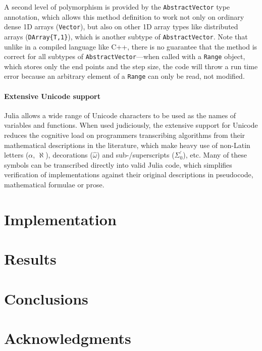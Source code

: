 \documentclass{article}
\begin{document}
A second level of polymorphism is provided by the \lstinline|AbstractVector|
type annotation, which allows this method definition to work not only on
ordinary dense 1D arrays (\lstinline|Vector|), but also on other 1D array types
like distributed arrays (\lstinline|DArray{T,1}|), which is another subtype of
\lstinline|AbstractVector|. Note that unlike in a compiled language like C++,
there is no guarantee that the method is correct for all subtypes of
\lstinline|AbstractVector|---when called with a \lstinline|Range| object, which
stores only the end points and the step size, the code will throw a run time
error because an arbitrary element of a \lstinline|Range| can only be read, not
modified.

\paragraph{Extensive Unicode support}
Julia allows a wide range of Unicode characters to be used as the names of
variables and functions. When used judiciously, the extensive support for
Unicode reduces the cognitive load on programmers transcribing algorithms from
their mathematical descriptions in the literature, which make heavy use of
non-Latin letters ($\alpha$, $\aleph$), decorations ($\hat{\omega}$) and
sub-/superscripts ($\Sigma^\prime_0$), etc. Many of these symbols can be
transcribed directly into valid Julia code, which simplifies verification of
implementations against their original descriptions in pseudocode, mathematical
formulae or prose.

\section{Implementation}

\section{Results}

\section{Conclusions}

\section*{Acknowledgments}


\end{document}
